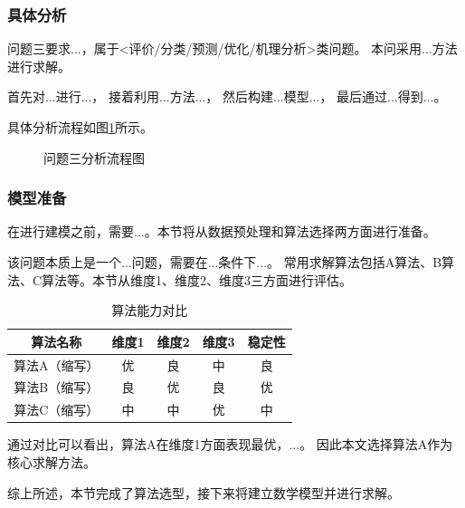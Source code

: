 
\subsubsection{具体分析}

问题三要求...，属于<评价/分类/预测/优化/机理分析>类问题。
本问采用...方法进行求解。

首先对...进行...，
接着利用...方法...，
然后构建...模型...，
最后通过...得到...。

具体分析流程如图\ref{fig:analysis3_flow}所示。

\begin{figure}[H]
  \begin{center}
    \caption{问题三分析流程图}
    \label{fig:analysis3_flow}
  \end{center}
\end{figure}

\subsubsection{模型准备}

在进行建模之前，需要...。本节将从数据预处理和算法选择两方面进行准备。

该问题本质上是一个...问题，需要在...条件下...。
常用求解算法包括A算法、B算法、C算法等。本节从维度1、维度2、维度3三方面进行评估。

\begin{table}[H]
  \centering
  \caption{算法能力对比}
  \begin{tabularx}{\textwidth}{CCCCC}
    \toprule
    算法名称 & 维度1 & 维度2 & 维度3 & 稳定性 \\
    \midrule
    算法A（缩写） & 优 & 良 & 中 & 良 \\
    算法B（缩写） & 良 & 优 & 良 & 优 \\
    算法C（缩写） & 中 & 中 & 优 & 中 \\
    \bottomrule
  \end{tabularx}
  \label{tab:算法对比3}
\end{table}

通过对比可以看出，算法A在维度1方面表现最优，...。
因此本文选择算法A作为核心求解方法。

综上所述，本节完成了算法选型，接下来将建立数学模型并进行求解。
